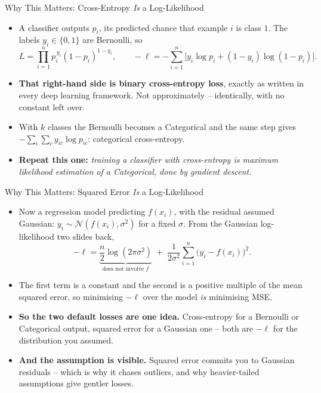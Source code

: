 \begin{frame}{Why This Matters: Cross-Entropy \emph{Is} a Log-Likelihood}
\begin{itemize}
  \item A classifier outputs $p_i$, its predicted chance that example $i$ is class $1$. The labels $y_i \in \{0,1\}$ are Bernoulli, so
  \[
    L = \prod_{i=1}^{n} p_i^{\,y_i}(1-p_i)^{1-y_i},
    \qquad
    -\ell = -\sum_{i=1}^{n}\Big[y_i \log p_i + (1-y_i)\log(1-p_i)\Big].
  \]
  \pause
  \item \textbf{That right-hand side is binary cross-entropy loss}, exactly as written in every deep learning framework. Not approximately -- identically, with no constant left over.
  \pause
  \item With $k$ classes the Bernoulli becomes a Categorical and the same step gives $-\sum_i \sum_c y_{ic}\log p_{ic}$: categorical cross-entropy.
  \pause
  \item \textbf{Repeat this one:} \emph{training a classifier with cross-entropy is maximum likelihood estimation of a Categorical, done by gradient descent.}
\end{itemize}
\end{frame}

\begin{frame}{Why This Matters: Squared Error \emph{Is} a Log-Likelihood}
\begin{itemize}
  \item Now a regression model predicting $f(x_i)$, with the residual assumed Gaussian: $y_i \sim \mathcal{N}(f(x_i), \sigma^2)$ for a fixed $\sigma$. From the Gaussian log-likelihood two slides back,
  \[
    -\ell = \underbrace{\frac{n}{2}\log(2\pi\sigma^2)}_{\text{does not involve } f}
    \;+\; \frac{1}{2\sigma^2}\sum_{i=1}^{n}\big(y_i - f(x_i)\big)^2 .
  \]
  \pause
  \item The first term is a constant and the second is a positive multiple of the mean squared error, so minimising $-\ell$ over the model \emph{is} minimising MSE.
  \pause
  \item \textbf{So the two default losses are one idea.} Cross-entropy for a Bernoulli or Categorical output, squared error for a Gaussian one -- both are $-\ell$ for the distribution you assumed.
  \pause
  \item \textbf{And the assumption is visible.} Squared error commits you to Gaussian residuals -- which is why it chases outliers, and why heavier-tailed assumptions give gentler losses.
\end{itemize}
\end{frame}

